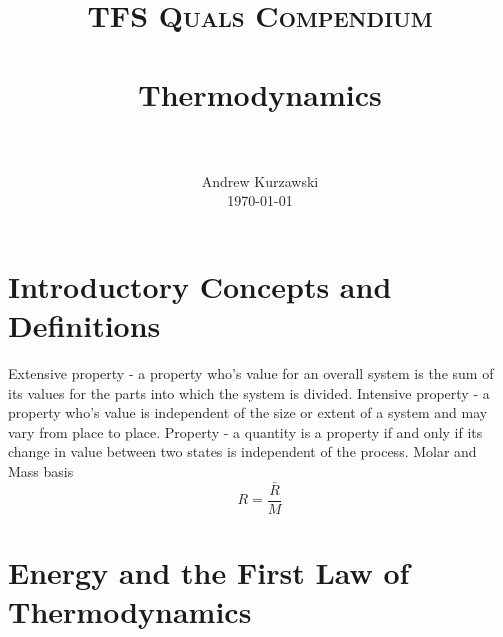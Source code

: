 \documentclass[paper=letter, fontsize=11pt]{scrartcl}
\title{
        \usefont{OT1}{bch}{b}{n}
        \normalfont \normalsize \textsc{TFS Quals Compendium} \\ [25pt]
        \horrule{0.5pt} \\[0.4cm]
        \huge Thermodynamics \\
        \horrule{2pt} \\[0.5cm]
}
\author{
        \normalfont                                 \normalsize
        Andrew Kurzawski\\[-3pt]      \normalsize
        \today
}
\date{}
\numberwithin{equation}{section}        %
\numberwithin{figure}{section}          %
\numberwithin{table}{section}               %
\begin{document}
\maketitle


\section{Introductory Concepts and Definitions}
    
Extensive property - a property who's value for an overall system is the sum of its values for the parts into which the system is divided.
\newline
\newline
Intensive property - a property who's value is independent of the size or extent of a system and may vary from place to place.
\newline
\newline
Property - a quantity is a property if and only if its change in value between two states is independent of the process.
\newline
\newline
Molar and Mass basis
\begin{equation}
    R = \frac{\bar R}{M}
\end{equation}


\newpage
\section{Energy and the First Law of Thermodynamics}
\end{document}
